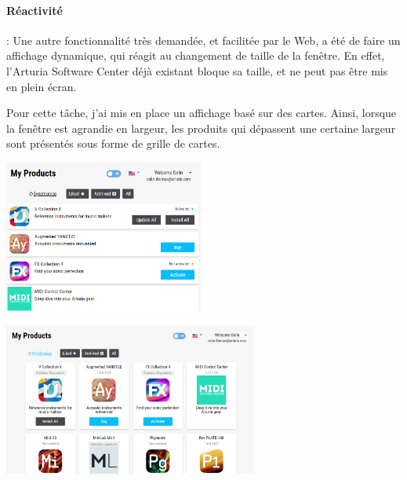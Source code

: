 \documentclass[francais]{rapportPFE}  %
\begin{document}

\paragraph{Réactivité}: Une autre fonctionnalité très demandée, et facilitée par le Web, a été de faire un affichage dynamique, qui réagit au changement de taille de la fenêtre. En effet, l'Arturia Software Center déjà existant bloque sa taille, et ne peut pas être mis en plein écran.

Pour cette tâche, j'ai mis en place un affichage basé sur des cartes. Ainsi, lorsque la fenêtre est agrandie en largeur, les produits qui dépassent une certaine largeur sont présentés sous forme de grille de cartes.

\begin{center}
    \centering
    \begin{minipage}{.5\textwidth}
    \centering
    \includegraphics[height=5cm]{graphics/small.png}
    \label{fig:test1}
    \end{minipage}%
    \begin{minipage}{.5\textwidth}
    \centering
    \includegraphics[height=5cm]{graphics/big.png}
    \label{fig:test2}
    \end{minipage}
\end{center}
\end{document}
